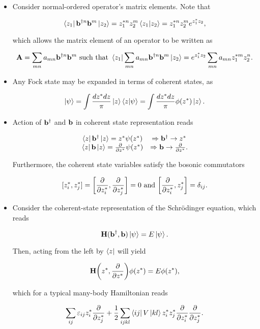 \documentclass{homework}
\begin{document}
\begin{itemize}
    \item Consider normal-ordered operator's matrix elements. Note that 
    
    $$
        \bra{z_1} {{\bf b}}^{\dagger n}       {{\bf b}}^{m} \ket{z_2} = z_1^{*n} z_2^m \bra{z_1}\ket{z_2} = z_1^{*n} z_2^{m} e^{z_1^* z_2},
    $$
    
    which allows the matrix element of an operator to be written as 
    
    $$
        {\bf A} = \sum_{mn} a_{mn} {{\bf b}}^{\dagger n} {{\bf b}}^{m} \textnormal{ such that } \bra{z_1} \sum_{mn} a_{mn} {{\bf b}}^{\dagger n} {{\bf b}}^{m} \ket{z_2} = e^{z_1^* z_2} \sum_{mn} a_{mn} z_1^{*m} z_2^n.
    $$
    
    \item Any Fock state may be expanded in terms of coherent states, as 
    
    $$
        \ket{\psi} = \int \frac{dz^* dz}{\pi} \ket{z} \bra{z} \ket{\psi} = \int \frac{dz^* dz}{\pi} \phi(z^*) \ket{z}.
    $$
    
    \item Action of ${{\bf b}}^{\dagger}$ and ${\bf b}$ in coherent state representation reads 
    
    $$
    \begin{array}{cc}
        \bra{z} {{\bf b}^\dagger} \ket{z} = z^* \psi(z^*) & \Rightarrow {{\bf b}^\dagger} \rightarrow z^*  \\
        \bra{z} {{\bf b}} \ket{z} = \frac{\partial}{\partial z^*} \psi(z^*) & \Rightarrow {\bf {{\bf b}}} \rightarrow \frac{\partial}{\partial z^*}. 
    \end{array}
    $$
    
    Furthermore, the coherent state variables satisfy the bosonic commutators 
    
    $$
    [z_i^*, z_j^*] = \bigg[\frac{\partial}{\partial z_i^*}, \frac{\partial}{\partial z_j^*}\bigg] = 0 \textnormal{ and } \bigg[\frac{\partial}{\partial z_i^*}, z_j^*\bigg] = \delta_{ij}.
    $$
    
    \item Consider the coherent-state representation of the Schr\"odinger equation, which reads 
    
    $$
        {{\bf H}}({{\bf b}^\dagger},  {{\bf b}}) \ket{\psi} = E \ket{\psi}.
    $$
    
    Then, acting from the left by $\bra{z}$ will yield 
    
    $$
        {{\bf H}}\bigg(z^*,\frac{\partial}{\partial z^*} \bigg) \phi(z^*) = E \phi(z^*),
    $$
    
    which for a typical many-body Hamiltonian reads
    
    $$
        \sum_{ij} \varepsilon_{ij} z_i^* \frac{\partial}{\partial z_j^*} + \frac{1}{2} \sum_{ijkl} \bra{ij} V \ket{kl} z_i^* z_j^* \frac{\partial}{\partial z_i^*} \frac{\partial}{\partial z_j^*}.
    $$
\end{itemize}
\end{document}
